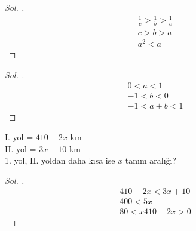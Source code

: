 \documentclass{article}
\theoremstyle{mytheoremstyle}
\theoremstyle{mytheoremstyle}
\theoremstyle{myproblemstyle}
\begin{document}
\begin{problem}
\end{problem}

\begin{proof}[\textit{ Sol. }]
  \begin{gather*}
    \frac{1}{c} > \frac{1}{b} > \frac{1}{a}\\
    c > b > a\\
    a^2 < a
  \end{gather*}
\end{proof}

\begin{problem}
\end{problem}

\begin{proof}[\textit{ Sol. }]
  \begin{align*}
    0 < a < 1\\
    -1 < b < 0\\
    -1 < a + b < 1
  \end{align*}
\end{proof}

\pagebreak
\begin{problem}
  I. yol = $ 410 - 2x $ km\\
  II. yol = $ 3x + 10 $ km\\
  1. yol, II. yoldan daha kısa ise $ x $ tanım aralığı?
\end{problem}

\begin{proof}[\textit{ Sol. }]
  \begin{align*}
    410 - 2x < 3x + 10\\
    400 < 5x\\
    80 < x
    410 - 2x > 0
  \end{align*}
\end{proof}
\end{document}
